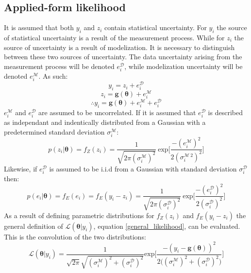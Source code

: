 \subsection{Applied-form likelihood}
It is assumed that both $y_i$ and $z_i$ contain statistical uncertainty. For $y_i$ the source of statistical uncertainty is a result of the measurement process. While for $z_i$ the source of uncertainty is a result of modelization. It is necessary to distinguish between these two sources of uncertainty. The data uncertainty arising from the measurement process will be denoted $e^{\mathcal{D}}_i$, while modelization uncertainty will be denoted $e^{\mathcal{M}}_i$. As such:
\begin{equation}
y_i = z_i + e^{\mathcal{D}}_i
\end{equation}
\begin{equation}
z_i = \bm{g}(\bm{\theta}) + e^{\mathcal{M}}_i
\end{equation}
\begin{equation}
\therefore y_i = \bm{g}(\bm{\theta}) + e^{\mathcal{M}}_i + e^{\mathcal{D}}_i
\end{equation}
$e^{\mathcal{M}}_i$ and $e^{\mathcal{D}}_i$ are assumed to be uncorrelated. If it is assumed that $e^{\mathcal{D}}_i$ is described as independant and indentically distributed from a Gaussian with a predetermined standard deviation $\sigma^{\mathcal{M}}_i$: 
\begin{equation}
p(z_i|\bm{\theta}) = f_Z(z_i) = \frac{1}{\sqrt{2\pi(\sigma^{\mathcal{M}}_i)^2}}\ \text{exp}\bigg[\frac{-(e^{\mathcal{M}}_i)^2}{2(\sigma^{\mathcal{M}\ 2}_i)^2} \bigg]
\end{equation} 
Likewise, if $e^{\mathcal{D}}_i$ is assumed to be i.i.d from a Gaussian with standard deviation $\sigma^{\mathcal{D}}_i$ then:
\begin{equation}
p(e_i|\bm{\theta}) = f_E(e_i) = f_E(y_i-z_i) = \frac{1}{\sqrt{2\pi(\sigma^{\mathcal{D}}_i)^2}}\ \text{exp}\bigg[\frac{-(e^{\mathcal{D}}_i)^2}{2(\sigma^{\mathcal{D}}_i)^2} \bigg]
\end{equation}
As a result of defining parametric distributions for $f_Z(z_i)$ and $f_E(y_i-z_i)$ the general definition of $\mathcal{L}(\bm{\theta}|y_i)$, equation \ref{general_likelihood}, can be evaluated. This is the convolution of the two distributions: 
\begin{equation}
\mathcal{L}(\bm{\theta}|y_i) = \frac{1}{\sqrt{2\pi}\sqrt{(\sigma^{\mathcal{M}}_i)^2+(\sigma^{\mathcal{D}}_i)^2}} \text{exp}\bigg[\frac{-(y_i-\bm{g}(\bm{\theta}))^2}{2\big((\sigma^{\mathcal{M}}_i)^2+(\sigma^{\mathcal{D}}_i)^2\big)}\bigg]
\label{single-data-likelihood}
\end{equation}\\

